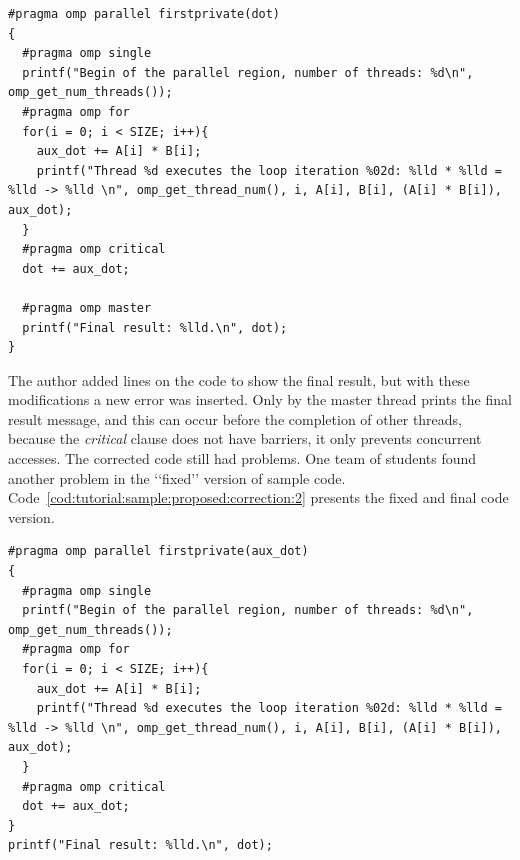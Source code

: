 \begin{lstlisting}[style=C, float=htpb, label=cod:tutorial:sample:proposed:correction:1,caption=The first version of "fixed" code.]
#pragma omp parallel firstprivate(dot)
{
  #pragma omp single
  printf("Begin of the parallel region, number of threads: %d\n", omp_get_num_threads());
  #pragma omp for
  for(i = 0; i < SIZE; i++){
    aux_dot += A[i] * B[i];
    printf("Thread %d executes the loop iteration %02d: %lld * %lld = %lld -> %lld \n", omp_get_thread_num(), i, A[i], B[i], (A[i] * B[i]), aux_dot);
  }
  #pragma omp critical
  dot += aux_dot;
  
  #pragma omp master
  printf("Final result: %lld.\n", dot);
}
\end{lstlisting}


The author added lines on the code to show the final result, but with these modifications a new error was inserted. Only by the master thread prints the final result message, and this can occur before the completion of other threads, because the \emph{critical} clause does not have barriers, it only prevents concurrent accesses. The corrected code still had problems. One team of students found another problem in the \lq\lq{}fixed\rq\rq{} version of sample code. Code~\ref{cod:tutorial:sample:proposed:correction:2} presents the fixed and final code version.
 
\begin{lstlisting}[style=C, float=htpb, label=cod:tutorial:sample:proposed:correction:2,caption=The final version of code sample.]
#pragma omp parallel firstprivate(aux_dot)
{
  #pragma omp single
  printf("Begin of the parallel region, number of threads: %d\n", omp_get_num_threads());
  #pragma omp for
  for(i = 0; i < SIZE; i++){
    aux_dot += A[i] * B[i];
    printf("Thread %d executes the loop iteration %02d: %lld * %lld = %lld -> %lld \n", omp_get_thread_num(), i, A[i], B[i], (A[i] * B[i]), aux_dot);
  }
  #pragma omp critical
  dot += aux_dot;
}
printf("Final result: %lld.\n", dot);
\end{lstlisting}
 
